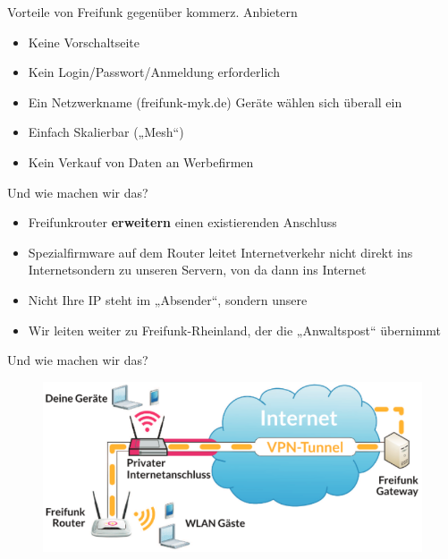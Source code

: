 \documentclass{beamer}
\begin{document}
\begin{frame}{Vorteile von Freifunk gegenüber kommerz. Anbietern}
\begin{itemize}
\item Keine Vorschaltseite
\item Kein Login/Passwort/Anmeldung erforderlich
\item Ein Netzwerkname (freifunk-myk.de) Geräte wählen sich überall ein 
\item Einfach Skalierbar („Mesh“)
\item Kein Verkauf von Daten an Werbefirmen
\end{itemize}
\end{frame}

\begin{frame}{Und wie machen wir das?}
\begin{itemize}
\item Freifunkrouter \textbf{erweitern} einen existierenden Anschluss
\item Spezialfirmware auf dem Router leitet Internetverkehr nicht direkt ins \glqq Internet\grqq sondern zu unseren Servern, von da dann ins Internet
\item Nicht Ihre IP steht im „Absender“, sondern unsere
\item Wir leiten weiter zu Freifunk-Rheinland, der die „Anwaltspost“ übernimmt
\end{itemize}
\end{frame}

\begin{frame}{Und wie machen wir das?}
\begin{figure}
\centering
\includegraphics[width=1.0\linewidth]{Bilder/VPN}
\label{fig:vpn}
\end{figure}
\end{frame}
\end{document}
